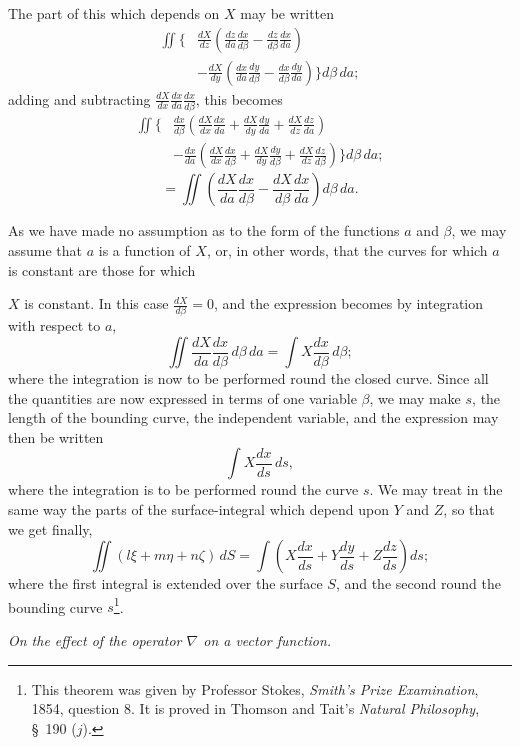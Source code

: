 \documentclass[11pt,a4paper]{article}
\begin{document}
The part of this which depends on \(X\) may be written
\[
\begin{aligned}
\iint\bigg\{&
\frac{dX}{dz}\left(\frac{dz}{da}\frac{dx}{d\beta}
-\frac{dz}{d\beta}\frac{dx}{da}\right)\\
&-\frac{dX}{dy}\left(\frac{dx}{da}\frac{dy}{d\beta}
-\frac{dx}{d\beta}\frac{dy}{da}\right)\bigg\}d\beta\,da;
\end{aligned}
\tag{6}
\]
adding and subtracting
\(\frac{dX}{dx}\frac{dx}{da}\frac{dx}{d\beta}\), this becomes
\[
\begin{aligned}
\iint\bigg\{&
\frac{dx}{d\beta}\left(\frac{dX}{dx}\frac{dx}{da}
+\frac{dX}{dy}\frac{dy}{da}
+\frac{dX}{dz}\frac{dz}{da}\right)\\
&-\frac{dx}{da}\left(\frac{dX}{dx}\frac{dx}{d\beta}
+\frac{dX}{dy}\frac{dy}{d\beta}
+\frac{dX}{dz}\frac{dz}{d\beta}\right)\bigg\}d\beta\,da;
\end{aligned}
\tag{7}
\]
\[
=\iint\left(\frac{dX}{da}\frac{dx}{d\beta}
-\frac{dX}{d\beta}\frac{dx}{da}\right)d\beta\,da.
\tag{8}
\]

As we have made no assumption as to the form of the functions \(a\) and
\(\beta\), we may assume that \(a\) is a function of \(X\), or, in other
words, that the curves for which \(a\) is constant are those for which

\clearpage
\setcounter{footnote}{0}

\(X\) is constant. In this case \(\frac{dX}{d\beta}=0\), and the
expression becomes by integration with respect to \(a\),
\[
\iint\frac{dX}{da}\frac{dx}{d\beta}\,d\beta\,da
=\int X\frac{dx}{d\beta}\,d\beta;
\tag{9}
\]
where the integration is now to be performed round the closed curve.
Since all the quantities are now expressed in terms of one variable
\(\beta\), we may make \(s\), the length of the bounding curve, the
independent variable, and the expression may then be written
\[
\int X\frac{dx}{ds}\,ds,
\tag{10}
\]
where the integration is to be performed round the curve \(s\). We may
treat in the same way the parts of the surface-integral which depend
upon \(Y\) and \(Z\), so that we get finally,
\[
\iint(l\xi+m\eta+n\zeta)\,dS
=\int\left(X\frac{dx}{ds}+Y\frac{dy}{ds}+Z\frac{dz}{ds}\right)ds;
\tag{11}
\]
where the first integral is extended over the surface \(S\), and the
second round the bounding curve \(s\)\footnote{This theorem was given by
Professor Stokes, \textit{Smith's Prize Examination}, 1854, question 8.
It is proved in Thomson and Tait's \textit{Natural Philosophy},
\S~190 (\(j\)).}.

\begin{center}
\textit{On the effect of the operator \(\nabla\) on a vector function.}
\end{center}
\end{document}
